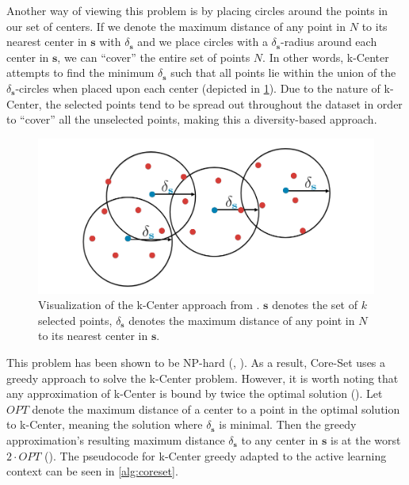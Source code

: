 \documentclass[english,bachelor,ul]{webisthesis} %
\begin{document}
Another way of viewing this problem is by placing circles around the points in our set of centers. If we denote the maximum distance of any point in $ N $ to its nearest center in $ \mathbf{s} $ with $ \delta_{\mathbf{s}} $ and we place circles with a $ \delta_{\mathbf{s}} $-radius around each center in $ \mathbf{s} $, we can ``cover'' the entire set of points $ N $. In other words, k-Center attempts to find the minimum $ \delta_{\mathbf{s}} $ such that all points lie within the union of the $ \delta_{\mathbf{s}} $-circles when placed upon each center (depicted in \ref{fig:coreset}). Due to the nature of k-Center, the selected points tend to be spread out throughout the dataset in order to ``cover'' all the unselected points, making this a diversity-based approach. 

\begin{figure}[htbp]
    \centering
    \includegraphics[width=1\textwidth]{img/core-set.png}
    \caption{Visualization of the k-Center approach from \cite{DBLP:conf/iclr/SenerS18}. $ \mathbf{s} $ denotes the set of $ k $ selected points, $ \delta_{\mathbf{s}} $ denotes the maximum distance of any point in $ N $ to its nearest center in $ \mathbf{s} $.}
    \label{fig:coreset}
\end{figure}

This problem has been shown to be NP-hard (\cite{DBLP:journals/dam/HsuN79}, \cite{DBLP:journals/anor/Hochbaum84}). As a result, Core-Set uses a greedy approach to solve the k-Center problem. However, it is worth noting that any approximation of k-Center is bound by twice the optimal solution (\cite{DBLP:journals/dam/HsuN79}). Let $ OPT $ denote the maximum distance of a center to a point in the optimal solution to k-Center, meaning the solution where $\delta_{\mathbf{s}} $ is minimal. Then the greedy approximation's resulting maximum distance $ \delta_{\mathbf{s}} $ to any center in $ \mathbf{s} $ is at the worst $ 2 \cdot OPT $ (\cite{mountkcenter}). The pseudocode for k-Center greedy adapted to the active learning context can be seen in \ref{alg:coreset}.
\end{document}
